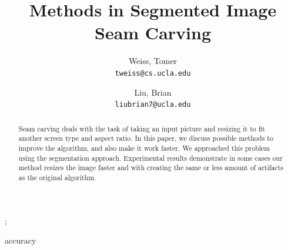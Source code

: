 \documentclass[conference]{acmsiggraph}
\title{Methods in Segmented Image Seam Carving}
\author{
  Weiss, Tomer\\
  \texttt{tweiss@cs.ucla.edu}
  \and
  Liu, Brian\\
  \texttt{liubrian7@ucla.edu}
}
\begin{document}

\maketitle

\begin{abstract}

\paragraph{}
Seam carving deals with the task of taking an input picture and resizing it to fit another screen type and aspect ratio. In this paper, we discuss possible methods to improve the algorithm, and also make it work faster. We approached this problem using the segmentation approach. Experimental results demonstrate in some cases our method resizes the image faster and with creating the same or less amount of artifacts as the original algorithm.




\end{abstract}

\begin{CRcatlist}  

  
  ;     
  
\end{CRcatlist}accuracy

\keywordlist

\end{document}

